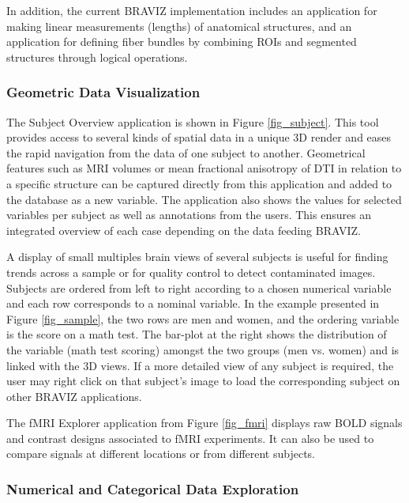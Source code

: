 \documentclass[twocolumn]{svjour3}
\begin{document}
In addition, the current BRAVIZ implementation includes an application for making linear measurements (lengths) of anatomical structures, and an application for defining fiber bundles by combining ROIs and segmented structures through logical operations.


\subsubsection{Geometric Data Visualization}

The Subject Overview application is shown in Figure \ref{fig_subject}. This tool  provides access to several kinds of spatial data in a unique 3D render and eases the rapid navigation from the data of one subject to another. Geometrical features such as MRI volumes or mean fractional anisotropy of DTI in relation to a specific structure can be captured directly from this application and added to the database as a new variable. The application also shows the values for selected variables per subject as well as annotations from the users. This ensures an integrated overview of each case depending on the data feeding BRAVIZ.

A display of small multiples \cite{tufte_visual_1983}  brain views  of several subjects is useful for finding trends across a sample or for quality control to detect contaminated images. Subjects are ordered from left to right according to a chosen numerical variable and each row corresponds to a nominal variable. In the example presented in Figure \ref{fig_sample}, the two rows are men and women, and the ordering variable is the score on a math test. The bar-plot at the right shows the distribution of the variable (math test scoring) amongst the two groups (men vs. women) and is linked with the 3D views. If a more detailed view of any subject is required, the user may right click on that subject’s image to load the corresponding subject on other BRAVIZ applications.

The fMRI Explorer application from Figure \ref{fig_fmri} displays raw BOLD signals and contrast designs associated to fMRI experiments. It can also be used to compare signals at different locations or from different subjects.



\subsubsection{Numerical and Categorical Data Exploration}
\end{document}
